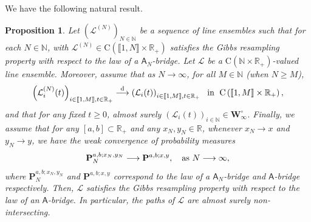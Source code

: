 \documentclass[]{article}
\newtheorem{prop}[thm]{Proposition}
\begin{document}
We have the following natural result.



\begin{prop}\label{PropositionLimitingGibbs}
Let $(\mathcal{L}^{(N)})_{N\in\mathbb{N}} $ be a sequence of line ensembles such that for each $N\in\mathbb{N}$, with $\mathcal{L}^{(N)}\in \mathrm{C}(\llbracket 1, N \rrbracket \times \mathbb{R}_+)$  satisfies the Gibbs resampling property with respect to the law of a $\mathsf{A}_N$-bridge. Let $\mathcal{L}$ be a $\mathrm{C}(\mathbb{N}\times\mathbb{R}_+)$-valued line ensemble. Moreover, assume that as $N \longrightarrow \infty$, for all $M \in \mathbb{N}$ (when $N\ge M$),
\begin{align*} \left(\mathcal{L}^{(N)}_{i}(t)\right)_{i\in \llbracket 1, M \rrbracket, t\in \mathbb{R}_+}\overset{\mathrm{d}}{\longrightarrow}\left(\mathcal{L}_{i}(t)\right)_{i\in \llbracket 1, M \rrbracket, t\in \mathbb{R}_+} \ \textnormal{ in }\; \mathrm{C}\left(\llbracket 1, M \rrbracket \times\mathbb{R}_+\right), 
\end{align*}
and that for any fixed $t\ge 0$, almost surely $(\mathcal{L}_i(t))_{i\in \mathbb{N}}\in \mathbf{W}_\infty^\circ$. Finally, we assume that for any $[a,b]\subset \mathbb{R}_+$ and any $x_N,y_N \in \mathbb{R}$, whenever $x_N \to x$ and $y_N \to y$, we have the weak convergence of probability measures
\begin{equation*}
\mathbf{P}_N^{a,b;x_N,y_N} \longrightarrow\mathbf{P}^{a,b;x,y}, \ \ \textnormal{ as } N \longrightarrow\infty,
\end{equation*}
where $\mathbf{P}_N^{a,b;x_N,y_N}$ and $\mathbf{P}^{a,b;x,y}$ correspond to the law of a $\mathsf{A}_N$-bridge and $\mathsf{A}$-bridge respectively. Then, $\mathcal{L}$ satisfies the Gibbs resampling property with respect to the law of an $\mathsf{A}$-bridge.
In particular, the paths of $\mathcal{L}$ are almost surely non-intersecting.
\end{prop}
\end{document}
